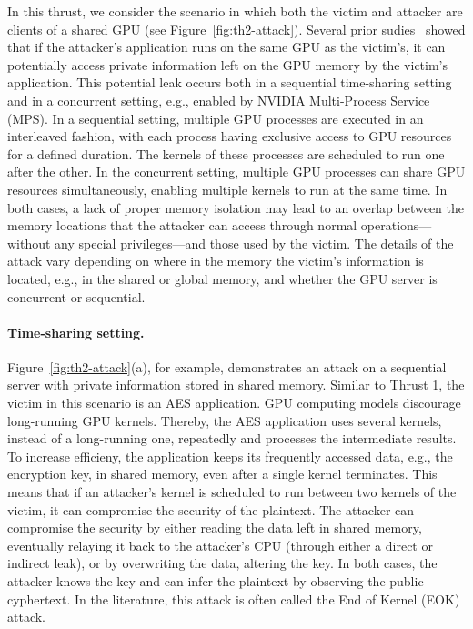In this thrust, we consider the scenario in which both the victim and attacker are clients of a shared GPU (see Figure~\ref{fig:th2-attack}). 
%
Several prior sudies~\cite{lee} showed that if the attacker's application runs on the same GPU as the victim's, it can potentially access private information left on the GPU memory by the victim's application.
%
This potential leak occurs both in a sequential time-sharing setting and in a concurrent setting, e.g., enabled by NVIDIA Multi-Process Service (MPS).
%
In a sequential setting, multiple GPU processes are executed in an interleaved fashion, with each process having exclusive access to GPU resources for a defined duration. The kernels of these processes are scheduled to run one after the other.
%
In the concurrent setting, multiple GPU processes can share GPU resources simultaneously, enabling multiple kernels to run at the same time.
%
In both cases, a lack of proper memory isolation may lead to an overlap between the memory locations that the attacker can access through normal operations—without any special privileges—and those used by the victim.
%
%
%
%
%
The details of the attack vary depending on where in the memory the victim's information is located, e.g., in the shared or global memory, and whether the GPU server is concurrent or sequential.
%

\paragraph{Time-sharing setting.}

Figure~\ref{fig:th2-attack}(a), for example, demonstrates an attack on a sequential server with private information stored in shared memory.
%
Similar to Thrust 1, the victim in this scenario is an AES application.
% 
GPU computing models discourage long-running GPU kernels. 
%
Thereby, the AES application uses several kernels, instead of a long-running one, repeatedly and processes the intermediate results. 
%
To increase efficieny, the application keeps its frequently accessed data, e.g., the encryption key, in shared memory, even after a single kernel terminates.
%
This means that if an attacker's kernel is scheduled to run between two kernels of the victim, it can compromise the security of the plaintext. 
%
The attacker can compromise the security by either reading the data left in shared memory, eventually relaying it back to the attacker's CPU (through either a direct or indirect leak), or by overwriting the data, altering the key.
%
In both cases, the attacker knows the key and can infer the plaintext by observing the public cyphertext. 
%
In the literature, this attack is often called the End of Kernel (EOK) attack.



